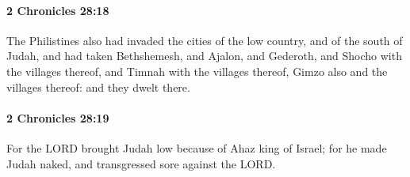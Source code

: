 		\paragraph{2 Chronicles 28:18} %
			\label{2CHRONICLES-28-18}

			The Philistines also had invaded the cities of the low country, and of the south of Judah, and had taken Bethshemesh, and Ajalon, and Gederoth, and Shocho with the villages thereof, and Timnah with the villages thereof, Gimzo also and the villages thereof: and they dwelt there.


		\paragraph{2 Chronicles 28:19} %
			\label{2CHRONICLES-28-19}

			For the LORD brought Judah low because of Ahaz king of Israel; for he made Judah naked, and transgressed sore against the LORD.

